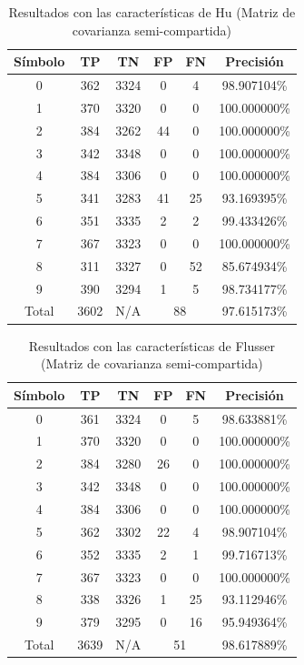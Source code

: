 \documentclass[a4paper, 11pt, oneside]{report}
\begin{document}
\begin{table}
\centering
\begin{tabular}{|c|c|c|c|c|c|}
\hline
Símbolo & TP & TN & FP & FN & Precisión \\ 
\hline
0 & 362 & 3324 & 0 & 4 & 98.907104\% \\ 
1 & 370 & 3320 & 0 & 0 & 100.000000\% \\ 
2 & 384 & 3262 & 44 & 0 & 100.000000\% \\ 
3 & 342 & 3348 & 0 & 0 & 100.000000\% \\ 
4 & 384 & 3306 & 0 & 0 & 100.000000\% \\ 
5 & 341 & 3283 & 41 & 25 & 93.169395\% \\ 
6 & 351 & 3335 & 2 & 2 & 99.433426\% \\ 
7 & 367 & 3323 & 0 & 0 & 100.000000\% \\ 
8 & 311 & 3327 & 0 & 52 & 85.674934\% \\ 
9 & 390 & 3294 & 1 & 5 & 98.734177\% \\ 
\hline
Total & 3602 & N/A & \multicolumn{2}{|c|}{88} & 97.615173\% \\
\hline
\end{tabular}
\caption{Resultados con las características de Hu (Matriz de covarianza semi-compartida)}
\label{tb:numHuShared}
\end{table}
\begin{table}
\centering
\begin{tabular}{|c|c|c|c|c|c|}
\hline
Símbolo & TP & TN & FP & FN & Precisión \\ 
\hline
0 & 361 & 3324 & 0 & 5 & 98.633881\% \\ 
1 & 370 & 3320 & 0 & 0 & 100.000000\% \\ 
2 & 384 & 3280 & 26 & 0 & 100.000000\% \\ 
3 & 342 & 3348 & 0 & 0 & 100.000000\% \\ 
4 & 384 & 3306 & 0 & 0 & 100.000000\% \\ 
5 & 362 & 3302 & 22 & 4 & 98.907104\% \\ 
6 & 352 & 3335 & 2 & 1 & 99.716713\% \\ 
7 & 367 & 3323 & 0 & 0 & 100.000000\% \\ 
8 & 338 & 3326 & 1 & 25 & 93.112946\% \\ 
9 & 379 & 3295 & 0 & 16 & 95.949364\% \\ 
\hline
Total & 3639 & N/A & \multicolumn{2}{|c|}{51} & 98.617889\% \\
\hline
\end{tabular}
\caption{Resultados con las características de Flusser (Matriz de covarianza semi-compartida)}
\label{tb:numFlShared}
\end{table}
\end{document}
